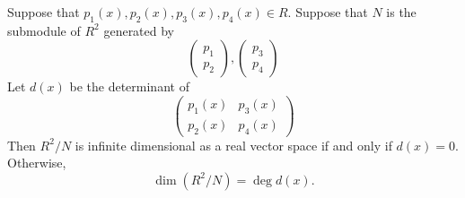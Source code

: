 \documentclass{unswmaths}
\begin{document}
\begin{proposition}
    Suppose that $p_1(x),p_2(x),p_3(x),p_4(x) \in R$. Suppose that $N$ is the submodule of $R^2$
    generated by
    \begin{equation*}
        \begin{pmatrix}
            p_1\\p_2
        \end{pmatrix},
        \begin{pmatrix}
            p_3\\p_4
        \end{pmatrix}
    \end{equation*}
    Let $d(x)$ be the determinant of 
    \begin{equation*}
        \begin{pmatrix}
            p_1(x) & p_3(x)\\
            p_2(x) & p_4(x)
        \end{pmatrix}
    \end{equation*}
    Then $R^2/N$ is infinite dimensional as a real vector space if and only if $d(x) = 0$. Otherwise,
    \begin{equation*}
        \dim(R^2/N) = \deg d(x).
    \end{equation*}
\end{proposition}
\end{document}
